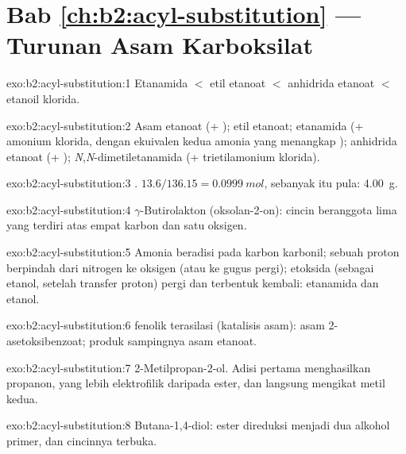 \section*{Bab \ref{ch:b2:acyl-substitution} --- Turunan Asam Karboksilat}

\begin{solution}{exo:b2:acyl-substitution:1}
Etanamida $<$ etil etanoat $<$ anhidrida etanoat $<$ etanoil klorida.
\end{solution}

\begin{solution}{exo:b2:acyl-substitution:2}
Asam etanoat (+ ); etil etanoat; etanamida (+ amonium klorida,
dengan ekuivalen kedua amonia yang menangkap ); anhidrida etanoat
(+ ); \textit{N},\textit{N}-dimetiletanamida (+ trietilamonium
klorida).
\end{solution}

\begin{solution}{exo:b2:acyl-substitution:3}
. $13.6/136.15 = \qty{0.0999}{mol}$, 
sebanyak itu pula: \qty{4.00}{g}.
\end{solution}

\begin{solution}{exo:b2:acyl-substitution:4}
$\gamma$-Butirolakton (oksolan-2-on): cincin beranggota lima yang terdiri atas empat karbon dan satu oksigen.
\end{solution}

\begin{solution}{exo:b2:acyl-substitution:5}
Amonia beradisi pada karbon karbonil; sebuah proton berpindah dari nitrogen
ke oksigen (atau ke gugus pergi); etoksida (sebagai etanol, setelah
transfer proton) pergi dan  terbentuk kembali: etanamida dan etanol.
\end{solution}

\begin{solution}{exo:b2:acyl-substitution:6}
 fenolik terasilasi (katalisis asam): asam 2-asetoksibenzoat; produk sampingnya asam etanoat.
\end{solution}

\begin{solution}{exo:b2:acyl-substitution:7}
2-Metilpropan-2-ol. Adisi pertama menghasilkan propanon, yang lebih
elektrofilik daripada ester, dan langsung mengikat metil kedua.
\end{solution}

\begin{solution}{exo:b2:acyl-substitution:8}
Butana-1,4-diol: ester direduksi menjadi dua alkohol primer, dan cincinnya terbuka.
\end{solution}

